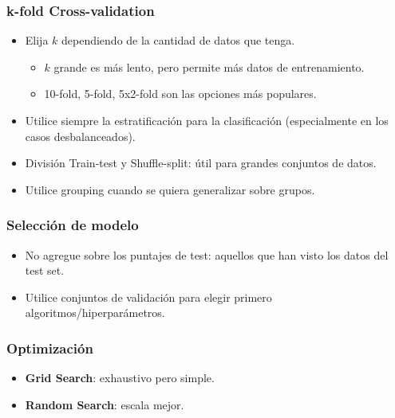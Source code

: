 \documentclass[a4paper, 11pt]{article}
\begin{document}
\subsubsection{k-fold Cross-validation}
\begin{itemize}
    \item Elija $k$ dependiendo de la cantidad de datos que tenga.
    \begin{itemize}
        \item $k$ grande es más lento, pero permite más datos de entrenamiento.
        \item 10-fold, 5-fold, 5x2-fold son las opciones más populares.
    \end{itemize}
    \item Utilice siempre la estratificación para la clasificación (especialmente en los casos desbalanceados).
    \item División Train-test y Shuffle-split: útil para grandes conjuntos de datos.
    \item Utilice grouping cuando se quiera generalizar sobre grupos.
\end{itemize}

\subsubsection{Selección de modelo}
\begin{itemize}
    \item No agregue sobre los puntajes de test: aquellos que han visto los datos del test set.
    \item Utilice conjuntos de validación para elegir primero algoritmos/hiperparámetros.
\end{itemize}

\subsubsection{Optimización}
\begin{itemize}
    \item \textbf{Grid Search}: exhaustivo pero simple.
    \item \textbf{Random Search}: escala mejor.
\end{itemize}
\end{document}
